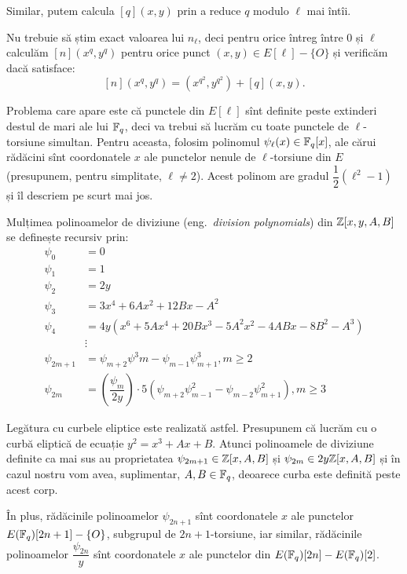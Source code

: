 Similar, putem calcula $ [q](x, y) $ prin a reduce $ q $ modulo $ \ell $ mai
întîi.

Nu trebuie să știm exact valoarea lui $ n_\ell $, deci pentru orice întreg
între 0 și $ \ell $ calculăm $ [n](x^q, y^q) $ pentru orice punct
$ (x, y) \in E[\ell] - \{ O \} $ și verificăm dacă satisface:
\[
    [n](x^q, y^q) = (x^{q^2}, y^{q^2}) + [q](x, y).
\]

Problema care apare este că punctele din $ E[\ell] $ sînt definite
peste extinderi destul de mari ale lui $ \mathbb{F}_q $, deci va trebui
să lucrăm cu toate punctele de $ \ell $-torsiune simultan. Pentru aceasta,
folosim polinomul $ \psi_\ell(x) \in \mathbb{F}_q[x] $, ale cărui rădăcini
sînt coordonatele $ x $ ale punctelor nenule de $ \ell $-torsiune
din $ E $ (presupunem, pentru simplitate, $ \ell \neq 2 $). Acest
polinom are gradul $ \dfrac{1}{2}(\ell^2 - 1) $ și îl descriem
pe scurt mai jos.

\begin{definition}\label{def:polinom-div}
  Mulțimea polinoamelor de diviziune (eng.\ \emph{division polynomials})
  din $ \mathbb{Z}[x, y, A, B] $ se definește recursiv prin:
  \begin{align*}
    \psi_0 &= 0 \\
    \psi_1 &= 1 \\
    \psi_2 &= 2y \\
    \psi_3 &= 3x^4 + 6Ax^2 + 12Bx - A^2 \\
    \psi_4 &= 4y\left(x^6 + 5Ax^4 + 20Bx^3 - 5A^2x^2 - 4ABx - 8B^2 - A^3\right) \\
           &\vdots \\
    \psi_{2m + 1} &= \psi_{m + 2} \psi^3 m - \psi_{m-1}\psi_{m+1}^3, m \geq 2 \\
    \psi_{2m} &= \left( \dfrac{\psi_m}{2y} \right) \cdot 5
                \left( \psi_{m+2}\psi_{m-1}^2 - \psi_{m-2} \psi_{m+1}^2 \right), m \geq 3
  \end{align*}
\end{definition}

Legătura cu curbele eliptice este realizată astfel. Presupunem că lucrăm
cu o curbă eliptică de ecuație $ y^2 = x^3 + Ax + B $. Atunci polinoamele
de diviziune definite ca mai sus au proprietatea $ \psi_{2m+1} \in \mathbb{Z}[x, A, B] $
și $ \psi_{2m} \in 2y \mathbb{Z}[x, A, B] $ și în cazul nostru vom avea,
suplimentar, $ A, B \in \mathbb{F}_q $, deoarece curba este definită peste acest corp.

În plus, rădăcinile polinoamelor $ \psi_{2n+1} $ sînt coordonatele $ x $
ale punctelor $ E(\mathbb{F}_q)[2n+1] - \{ O \} $, subgrupul de $ 2n + 1 $-torsiune,
iar similar, rădăcinile polinoamelor $ \dfrac{\psi_{2n}}{y} $ sînt
coordonatele $ x $ ale punctelor din $ E(\mathbb{F}_q)[2n] - E(\mathbb{F}_q)[2] $.

